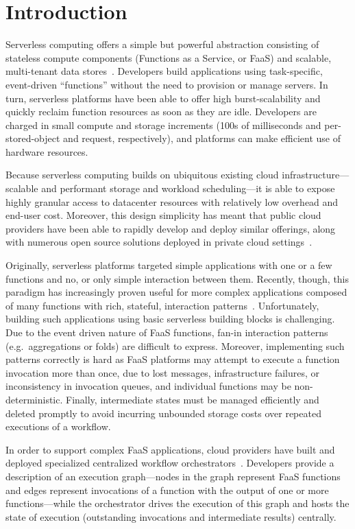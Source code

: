 \section{Introduction}\label{sec:intro}

Serverless computing offers a simple but powerful abstraction consisting of
stateless compute components (Functions as a Service, or FaaS) and scalable,
multi-tenant data stores~\cite{berkeley}. Developers build applications using
task-specific, event-driven ``functions'' without the need to provision or
manage servers. In turn, serverless platforms have been able to offer high
burst-scalability and quickly reclaim function resources as soon as they are
idle. Developers are charged in small compute and storage increments (100s of
milliseconds and per-stored-object and request, respectively), and platforms
can make efficient use of hardware resources.

Because serverless computing builds on ubiquitous existing cloud
infrastructure---scalable and performant storage and workload scheduling---it is
able to expose highly granular access to datacenter resources with relatively
low overhead and end-user cost. Moreover, this design simplicity has meant that
public cloud providers have been able to rapidly develop and deploy similar
offerings, along with numerous open source solutions deployed in private cloud
settings~\cite{aws-lambda,gcp-functions,azure-functions,openwhisk,openfaas}.

Originally, serverless platforms targeted simple applications with one or a few
functions and no, or only simple interaction between them. Recently, though,
this paradigm has increasingly proven useful for more complex applications
composed of many functions with rich, stateful, interaction
patterns~\cite{excamera, pywren, gg-atc, beldi, boki}. Unfortunately, building
such applications using basic serverless building blocks is challenging.  Due to
the event driven nature of FaaS functions, fan-in interaction patterns (e.g.\
aggregations or folds) are difficult to express. Moreover, implementing such
patterns correctly is hard as FaaS platforms may attempt to execute a function
invocation more than once, due to lost messages, infrastructure failures, or
inconsistency in invocation queues, and individual functions may be
non-deterministic.  Finally, intermediate states must be managed efficiently and
deleted promptly to avoid incurring unbounded storage costs over repeated
executions of a workflow.

In order to support complex FaaS applications, cloud providers have built and
deployed specialized centralized workflow
orchestrators~\cite{aws-step-functions, google-cloud-composer, google-workflows,
durable-functions}. Developers provide a description of an execution
graph---nodes in the graph represent FaaS functions and edges represent
invocations of a function with the output of one or more functions---while the
orchestrator drives the execution of this graph and hosts the state of execution
(outstanding invocations and intermediate results) centrally.

